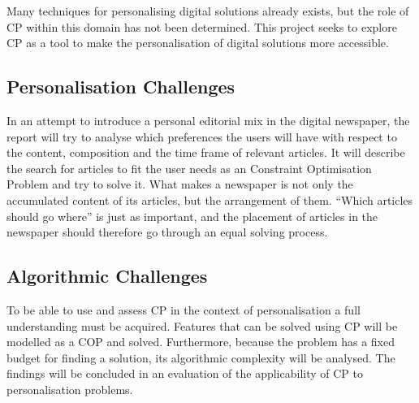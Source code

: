 Many techniques for personalising digital solutions already exists, but the role of CP within this domain has not been determined. This project seeks to explore CP as a tool to make the personalisation of digital solutions more accessible.

\subsection{Personalisation Challenges}
In an attempt to introduce a personal editorial mix in the digital newspaper, the report will try to analyse which preferences the users will have with respect to the content, composition and the time frame of relevant articles. It will describe the search for articles to fit the user needs as an Constraint Optimisation Problem and try to solve it. What makes a newspaper is not only the accumulated content of its articles, but the arrangement of them. ``Which articles should go where'' is just as important, and the placement of articles in the newspaper should therefore go through an equal solving process.

\subsection{Algorithmic Challenges}
To be able to use and assess CP in the context of personalisation a full understanding must be acquired. Features that can be solved using CP will be modelled as a COP and solved. Furthermore, because the problem has a fixed budget for finding a solution, its algorithmic complexity will be analysed. The findings will be concluded in an evaluation of the applicability of CP to personalisation problems.

